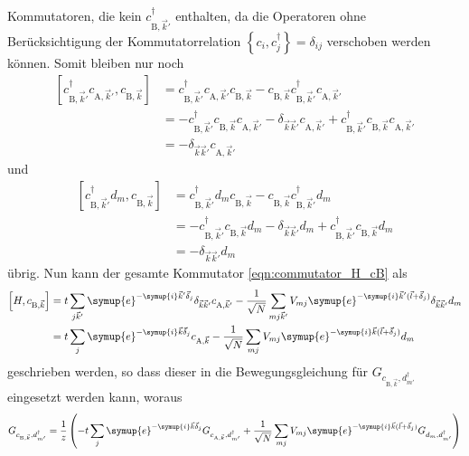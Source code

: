 Kommutatoren, die kein $c^\dagger_{\text{B},\vec{k}'}$ enthalten, da die Operatoren ohne Berücksichtigung der Kommutatorrelation 
$\left \{ c_i, c^\dagger_j \right \} = \delta_{ij}$ verschoben werden können.
Somit bleiben nur noch 
\begin{align*}
    \left [ c^\dagger_{\text{B},\vec{k}'} c_{\text{A},\vec{k}'}, c_{\text{B},\vec{k}} \right ]
        &= c^\dagger_{\text{B},\vec{k}'} c_{\text{A},\vec{k}'} c_{\text{B},\vec{k}} - c_{\text{B},\vec{k}} c^\dagger_{\text{B},\vec{k}'} c_{\text{A},\vec{k}'} \\
        &= - c^\dagger_{\text{B},\vec{k}'} c_{\text{B},\vec{k}} c_{\text{A},\vec{k}'} - \delta_{\vec{k}\vec{k}'} c_{\text{A},\vec{k}'}
        + c^\dagger_{\text{B},\vec{k}'} c_{\text{B},\vec{k}} c_{\text{A},\vec{k}'} \\
        &=  - \delta_{\vec{k}\vec{k}'} c_{\text{A},\vec{k}'}
\end{align*}
und 
\begin{align*}
    \left [ c^\dagger_{\text{B},\vec{k}'} d_m, c_{\text{B},\vec{k}} \right ] &=
        c^\dagger_{\text{B},\vec{k}'} d_m c_{\text{B},\vec{k}} - c_{\text{B},\vec{k}} c^\dagger_{\text{B},\vec{k}'} d_m \\
        &= - c^\dagger_{\text{B},\vec{k}'} c_{\text{B},\vec{k}} d_m - \delta_{\vec{k}\vec{k}'} d_m + c^\dagger_{\text{B},\vec{k}'} c_{\text{B},\vec{k}} d_m \\
        &= - \delta_{\vec{k}\vec{k}'} d_m
\end{align*}
übrig.
Nun kann der gesamte Kommutator \eqref{eqn:commutator_H_cB} als 
\begin{align*}
    \left [ H, c_{\text{B},\vec{k}} \right ]
     &= t \sum_{j\vec{k}'} \symup{e}^{-\symup{i}\vec{k}' \vec{\delta}_j} \delta_{\vec{k}\vec{k}'} c_{\text{A},\vec{k}'}
      - \frac{1}{\sqrt{N}}\sum_{mj\vec{k}'} V_{mj} \symup{e}^{-\symup{i}\vec{k}' (\vec{l} + \vec{\delta}_j)} \delta_{\vec{k}\vec{k}'} d_m  \\
     &=  t \sum_{j} \symup{e}^{-\symup{i}\vec{k} \vec{\delta}_j} c_{\text{A},\vec{k}}
     - \frac{1}{\sqrt{N}}\sum_{mj} V_{mj} \symup{e}^{-\symup{i}\vec{k} (\vec{l} + \vec{\delta}_j)} d_m
\end{align*}
geschrieben werden, so dass dieser in die Bewegungsgleichung für $G_{c_{\text{B},\vec{k}}, d^\dagger_{m'}}$ eingesetzt werden kann, woraus
\begin{align}
    G_{c_{\text{B},\vec{k}}, d^\dagger_{m'}} =\frac{1}{z} \left (- t \sum_{j} \symup{e}^{-\symup{i}\vec{k} \vec{\delta}_j} G_{c_{\text{A},\vec{k}},d^\dagger_{m'}} + 
    \frac{1}{\sqrt{N}} \sum_{mj} V_{mj} \symup{e}^{-\symup{i}\vec{k} (\vec{l}+ \vec{\delta}_j)} G_{d_m, d_{m'}^\dagger} \right )  \label{eqn:greensfunction_cB}
\end{align}
